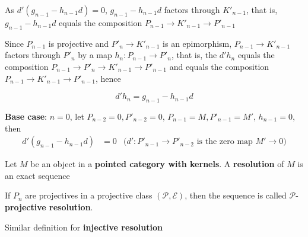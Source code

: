 \begin{longproof}
\begin{enumerate}
		\begin{center}
		\end{center}
		
		As $d'(g_{n-1} - h_{n-1} d) = 0$, $g_{n-1} - h_{n-1} d$ factors through $K'_{n-1}$, that is, $g_{n-1} - h_{n-1} d$ equals the composition $P_{n-1} \to K'_{n-1} \to P'_{n-1}$
		
		Since $P_{n-1}$ is projective and $P'_n \to K'_{n-1}$ is an epimorphism, $P_{n-1} \to K'_{n-1}$ factors through $P'_n$ by a map $h_n: P_{n-1} \to P'_n$, that is, the $d' h_n$ equals the composition $P_{n-1} \to P'_n \to K'_{n-1} \to P'_{n-1}$ and equals the composition $P_{n-1} \to K'_{n-1} \to P'_{n-1}$, hence
		
		$$
		d' h_n = g_{n-1} - h_{n-1} d
		$$
		
		\textbf{Base case}: $n=0$, let $P_{n-2} = 0, P'_{n-2} = 0$, $P_{n-1} = M, P'_{n-1} = M'$, $h_{n-1} = 0$, then 
		\begin{align*}
			d'(g_{n-1} - h_{n-1} d) 
			&= 0 &\text{($d': P'_{n-1} \to P'_{n-2}$ is the zero map $M' \to 0$)}
		\end{align*}
		
	\end{enumerate}
\end{longproof}

\begin{definition}
	Let $M$ be an object in a \textbf{pointed category with kernels}. A \textbf{resolution} of $M$ is an exact sequence
	\begin{center}
	\end{center}
	
	If $P_n$ are projectives in a projective class $(\mathcal{P}, \mathcal{E})$, then the sequence is called $\mathcal{P}$-\textbf{projective resolution}.
	
	Similar definition for \textbf{injective resolution}
\end{definition}

